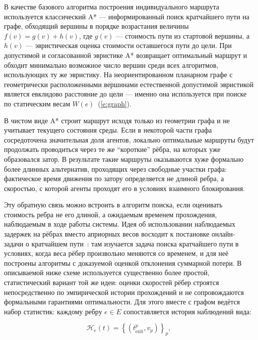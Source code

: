 В качестве базового алгоритма построения индивидуального маршрута используется классический A* 
\cite{astar} --- информированный поиск кратчайшего пути на графе, обходящий вершины в порядке 
возрастания величины $f(v) = g(v) + h(v)$, где $g(v)$ --- стоимость пути из стартовой вершины, а 
$h(v)$ --- эвристическая оценка стоимости оставшегося пути до цели. При допустимой и согласованной 
эвристике A* возвращает оптимальный маршрут и обходит минимально возможное число вершин среди всех 
алгоритмов, использующих ту же эвристику. На неориентированном планарном графе с геометрически 
расположенными вершинами естественной допустимой эвристикой является евклидово расстояние до цели --- 
именно она используется при поиске по статическим весам $W(e)$~(\ref{e:graph}).

В чистом виде A* строит маршрут исходя только из геометрии графа и не учитывает текущего состояния 
среды. Если в некоторой части графа сосредоточена значительная доля агентов, локально оптимальные 
маршруты будут продолжать проводиться через те же \enquote{короткие} рёбра, на которых уже образовался 
затор. В результате такие  маршруты оказываются хуже формально более длинных альтернатив, проходящих 
через свободные участки графа: фактическое время движения по затору определяется не длиной ребра, 
а скоростью, с которой агенты проходят его в условиях взаимного блокирования.

Эту обратную связь можно встроить в алгоритм поиска, если оценивать стоимость ребра не его длиной, 
а ожидаемым временем прохождения, наблюдаемым в ходе работы системы. Идея об использовании наблюдаемых 
задержек на рёбрах вместо априорных весов восходит к постановке онлайн-задачи о кратчайшем 
пути~\cite{online-shortest-path}: там изучается задача поиска кратчайшего пути в условиях, 
когда веса рёбер произвольно меняются со временем, и для неё построены алгоритмы с доказуемой оценкой 
отклонения суммарной потери. В описываемой ниже схеме используется существенно более простой, 
статистический вариант той же идеи: оценки скоростей рёбер строятся непосредственно по эмпирической 
истории прохождений и не сопровождаются формальными гарантиями оптимальности. Для этого вместе с 
графом ведётся набор статистик: каждому ребру $e \in E$ сопоставляется история наблюдений вида:

\begin{equation}
    \mathcal{H}_e(t) = \left\{ \left( t^{p}_{\mathrm{exit}}, v_p \right) \right\}_{p},
\label{e:stat-history}
\end{equation}


